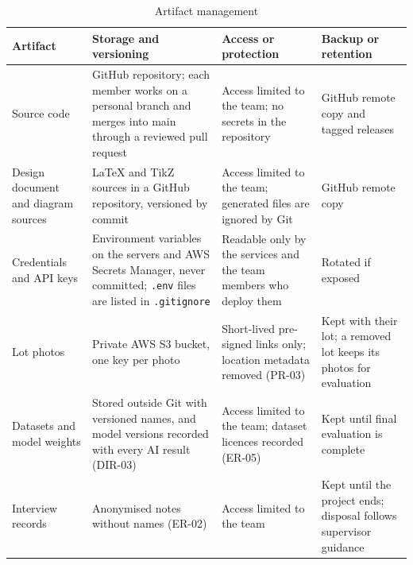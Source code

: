 \begin{table}[H]
\centering
\caption{Artifact management}
\label{tab:artifact-management}
\footnotesize
\begin{tabularx}{\textwidth}{@{}>{\raggedright\arraybackslash}p{}>{\raggedright\arraybackslash}X >{\raggedright\arraybackslash}X >{\raggedright\arraybackslash}X@{}}
\toprule
\textbf{Artifact} & \textbf{Storage and versioning} & \textbf{Access or protection} & \textbf{Backup or retention} \\
\midrule
Source code & GitHub repository; each member works on a personal branch and merges into main through a reviewed pull request & Access limited to the team; no secrets in the repository & GitHub remote copy and tagged releases \\
Design document and diagram sources & LaTeX and TikZ sources in a GitHub repository, versioned by commit & Access limited to the team; generated files are ignored by Git & GitHub remote copy \\
Credentials and API keys & Environment variables on the servers and AWS Secrets Manager, never committed; \texttt{.env} files are listed in \texttt{.gitignore} & Readable only by the services and the team members who deploy them & Rotated if exposed \\
Lot photos & Private AWS S3 bucket, one key per photo & Short-lived pre-signed links only; location metadata removed (PR-03) & Kept with their lot; a removed lot keeps its photos for evaluation \\
Datasets and model weights & Stored outside Git with versioned names, and model versions recorded with every AI result (DIR-03) & Access limited to the team; dataset licences recorded (ER-05) & Kept until final evaluation is complete \\
Interview records & Anonymised notes without names (ER-02) & Access limited to the team & Kept until the project ends; disposal follows supervisor guidance \\
\bottomrule
\end{tabularx}
\end{table}

